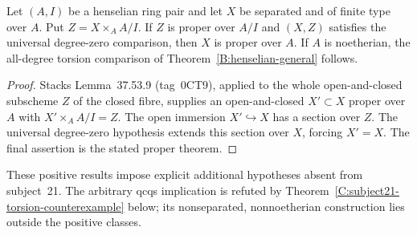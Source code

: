 \begin{corollary}\label{C:henselian-proper-closed-fibre}
Let $(A,I)$ be a henselian ring pair and let $X$ be separated and of
finite type over $A$. Put $Z=X\times_A A/I$. If $Z$ is proper over
$A/I$ and $(X,Z)$ satisfies the universal degree-zero comparison,
then $X$ is proper over $A$. If $A$ is noetherian, the all-degree
torsion comparison of Theorem~\ref{B:henselian-general} follows.
\end{corollary}
\begin{proof}
Stacks Lemma~37.53.9 (tag~0CT9), applied to the whole open-and-closed
subscheme $Z$ of the closed fibre, supplies an open-and-closed
$X'\subset X$ proper over $A$ with $X'\times_A A/I=Z$.
The open immersion $X'\hookrightarrow X$ has a section over $Z$.
The universal degree-zero hypothesis extends this section over $X$,
forcing $X'=X$. The final assertion is the stated proper theorem.
\end{proof}

These positive results impose explicit additional hypotheses absent
from subject~21. The arbitrary qcqs implication is refuted by
Theorem~\ref{C:subject21-torsion-counterexample} below; its nonseparated,
nonnoetherian construction lies outside the positive classes.

